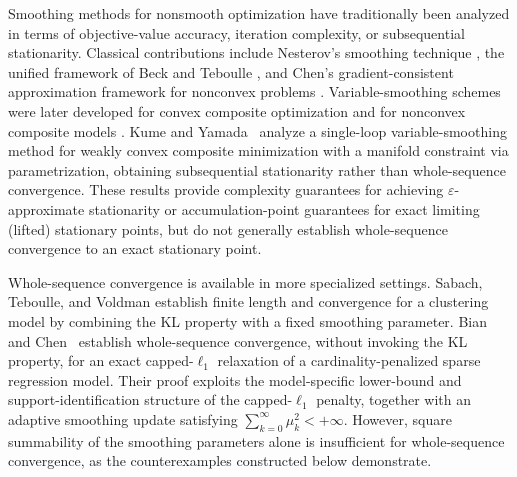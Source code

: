 \documentclass[11pt]{article}
\numberwithin{equation}{section}
\begin{document}

Smoothing methods for nonsmooth optimization have traditionally been analyzed
in terms of objective-value accuracy, iteration complexity, or subsequential
stationarity. Classical contributions include Nesterov's smoothing technique
\cite{Nesterov2005}, the unified framework of Beck and Teboulle
\cite{BeckTeboulle2012}, and Chen's gradient-consistent approximation framework
for nonconvex problems \cite{Chen2012}. Variable-smoothing schemes were later
developed for convex composite optimization
\cite{BotBohm2020,BotHendrich2015} and for nonconvex composite models
\cite{BohmWright2021,LiuXia2024,LongEtAl2026}. Kume and Yamada~\cite{KumeYamada2025} analyze a single-loop
variable-smoothing method for weakly convex composite minimization
with a manifold constraint via parametrization, obtaining
subsequential stationarity rather than whole-sequence convergence.
 These results provide
complexity guarantees for achieving $\varepsilon$-approximate stationarity or
accumulation-point guarantees for exact limiting (lifted) stationary points,
but do not generally establish whole-sequence convergence to an exact
stationary point.


Whole-sequence convergence is available in more specialized settings. Sabach,
Teboulle, and Voldman \cite{SabachTeboulleVoldman2018} establish finite length
and convergence for a clustering model by combining the KL property with a
fixed smoothing parameter.  Bian and Chen~\cite{BianChen2020} establish whole-sequence convergence,
without invoking the KL property, for an exact capped-$\ell_1$ relaxation
of a cardinality-penalized sparse regression model. Their proof exploits
the model-specific lower-bound and support-identification structure of the
capped-$\ell_1$ penalty, together with an adaptive smoothing update satisfying
\(\sum_{k=0}^{\infty}\mu_k^2<+\infty\). However, square summability of the smoothing parameters
alone is insufficient for whole-sequence convergence, as the counterexamples
constructed below demonstrate.
\end{document}
